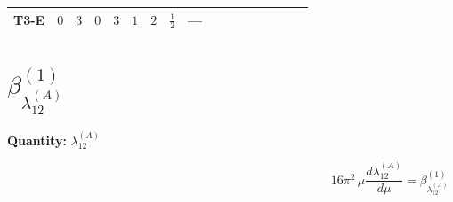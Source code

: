 \documentclass[8pt]{article}
\begin{document}
\begin{landscape}
\begin{longtable}{@{}llcccccc >{\raggedright\arraybackslash}p{0.21\linewidth} >{\raggedright\arraybackslash}p{0.21\linewidth}@{}}
\midrule
T3-E & $0$ & $3$ & $0$ & $3$ & $1$ & $2$ & $\frac{1}{2}$ & --- & \scriptsize\adjustbox{max width=\linewidth}{$\begin{gathered} {\lambda_5} \left(6 \operatorname{Tr}\!\left({Y_d}\,\left({Y_d}\right)^{\dagger}\right)+2 \operatorname{Tr}\!\left({Y_e}\,\left({Y_e}\right)^{\dagger}\right)+6 \operatorname{Tr}\!\left({Y_u}\,\left({Y_u}\right)^{\dagger}\right)-\frac{4 {\lambda_{12}^{(A)}}}{3}-2 {\lambda_{12}^{(\times)}}-2 {\lambda_{HS_1}^{(A)}}-\frac{4 {\lambda_{HS_2}^{(A)}}}{3}\right)\end{gathered}$} \\
\midrule
\bottomrule
\end{longtable}
\clearpage
\section*{$\beta_{\lambda_{12}^{(A)}}^{(1)}$}
\noindent\textbf{Quantity: }$\lambda_{12}^{(A)}$\par\smallskip
\[16\pi^2\,\mu\frac{d \lambda_{12}^{(A)}}{d\mu}=\beta_{\lambda_{12}^{(A)}}^{(1)}\]

\end{landscape}
\end{document}

